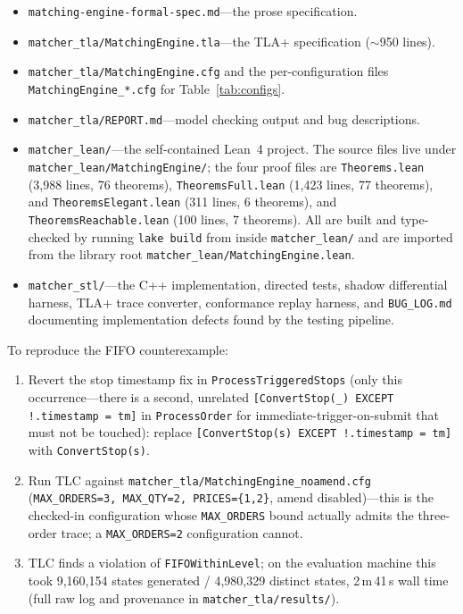 \documentclass[11pt,a4paper]{article}
\begin{document}
\begin{itemize}[nosep]
\item \texttt{matching-engine-formal-spec.md}---the prose specification.
\item \texttt{matcher\_tla/MatchingEngine.tla}---the TLA+ specification
      ($\sim$950 lines).
\item \texttt{matcher\_tla/MatchingEngine.cfg} and the
      per-configuration files \texttt{MatchingEngine\_*.cfg} for
      Table~\ref{tab:configs}.
\item \texttt{matcher\_tla/REPORT.md}---model checking output and bug
      descriptions.
\item \texttt{matcher\_lean/}---the self-contained Lean~4 project.
      The source files live under \texttt{matcher\_lean/MatchingEngine/};
      the four proof files are \texttt{Theorems.lean} (3{,}988 lines,
      76 theorems), \texttt{TheoremsFull.lean} (1{,}423 lines,
      77 theorems), and \texttt{TheoremsElegant.lean} (311 lines,
      6 theorems), and \texttt{TheoremsReachable.lean} (100 lines,
      7 theorems). All are built and type-checked by running
      \texttt{lake build} from inside \texttt{matcher\_lean/} and are
      imported from the library root \texttt{matcher\_lean/MatchingEngine.lean}.
\item \texttt{matcher\_stl/}---the C++ implementation, directed tests,
      shadow differential harness, TLA+ trace converter, conformance
      replay harness, and \texttt{BUG\_LOG.md} documenting implementation
      defects found by the testing pipeline.
\end{itemize}

To reproduce the FIFO counterexample:
\begin{enumerate}[nosep]
\item Revert the stop timestamp fix in \texttt{ProcessTriggeredStops}
      (only this occurrence---there is a second, unrelated
      \texttt{[ConvertStop(\_) EXCEPT !.timestamp = tm]} in
      \texttt{ProcessOrder} for immediate-trigger-on-submit that must
      not be touched): replace
      \texttt{[ConvertStop(s) EXCEPT !.timestamp = tm]} with
      \texttt{ConvertStop(s)}.
\item Run TLC against \texttt{matcher\_tla/MatchingEngine\_noamend.cfg}
      (\texttt{MAX\_ORDERS=3, MAX\_QTY=2, PRICES=\{1,2\}}, amend
      disabled)---this is the checked-in configuration whose
      \texttt{MAX\_ORDERS} bound actually admits the three-order trace;
      a \texttt{MAX\_ORDERS=2} configuration cannot.
\item TLC finds a violation of \texttt{FIFOWithinLevel}; on the
      evaluation machine this took 9{,}160{,}154 states generated /
      4{,}980{,}329 distinct states, 2\,m\,41\,s wall time (full raw log
      and provenance in \texttt{matcher\_tla/results/}).
\end{enumerate}
\end{document}
